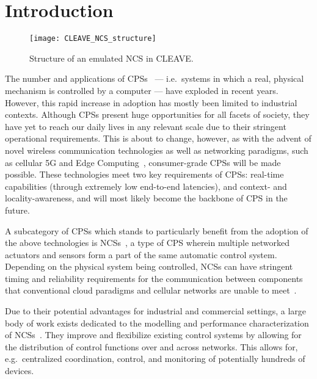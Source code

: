 \section{Introduction}\label{sec:intro}

\begin{figure*}
    \centering
    \texttt{[image: CLEAVE\_NCS\_structure]}
    \caption{
        Structure of an emulated \ac{NCS} in \acs*{CLEAVE}.
    }\label{fig:cleave:ncs:struct}
\end{figure*}

The number and applications of \acp{CPS}~\cite{Rajkumar2010CPS} --- i.e.\ systems in which a real, physical mechanism is controlled by a computer --- have exploded in recent years.
However, this rapid increase in adoption has mostly been limited to industrial contexts.
Although \acp{CPS} present huge opportunities for all facets of society, they have yet to reach our daily lives in any relevant scale due to their stringent operational requirements.
This is about to change, however, as with the advent of novel wireless communication technologies as well as networking paradigms, such as cellular 5G and Edge Computing~\cite{Satya2017Emergence}, consumer-grade \acp{CPS} will be made possible.
These technologies meet two key requirements of \acp{CPS}: real-time capabilities (through extremely low end-to-end latencies), and context- and locality-awareness, and will most likely become the backbone of \ac{CPS} in the future.

A subcategory of \acp{CPS} which stands to particularly benefit from the adoption of the above technologies is \acp{NCS}~\cite{Gupta2010NCSOverview}, a type of \ac{CPS} wherein multiple networked actuators and sensors form a part of the same automatic control system.
Depending on the physical system being controlled, \acp{NCS} can have stringent timing and reliability requirements for the communication between components that conventional cloud paradigms and cellular networks are unable to meet~\cite{Wan2020Efficient}.

Due to their potential advantages for industrial and commercial settings, a large body of work exists dedicated to the modelling and performance characterization of \acp{NCS}~\cite{Zhang2013Survey,Zhang2016Survey}.
They improve and flexibilize existing control systems by allowing for the distribution of control functions over and across networks.
This allows for, e.g.\ centralized coordination, control, and monitoring of potentially hundreds of devices.

